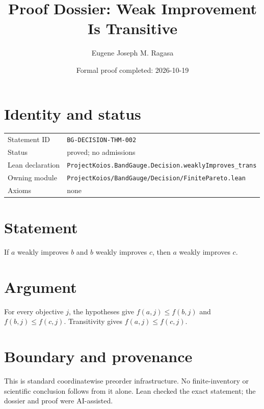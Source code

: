 \documentclass[11pt]{article}
\title{Proof Dossier: Weak Improvement Is Transitive}
\author{Eugene Joseph M. Ragasa}
\date{Formal proof completed: 2026-10-19}
\begin{document}
\maketitle
\section{Identity and status}
\begin{tabularx}{\textwidth}{@{}lX@{}}\toprule
Statement ID & \texttt{BG-DECISION-THM-002} \\
Status & proved; no admissions \\
Lean declaration & \texttt{ProjectKoios.BandGauge.Decision.weaklyImproves\_trans} \\
Owning module & \texttt{ProjectKoios/BandGauge/Decision/FinitePareto.lean} \\
Axioms & none \\
\bottomrule\end{tabularx}
\section{Statement}
If $a$ weakly improves $b$ and $b$ weakly improves $c$, then $a$ weakly improves $c$.
\section{Argument}
For every objective $j$, the hypotheses give $f(a,j)\le f(b,j)$ and
$f(b,j)\le f(c,j)$. Transitivity gives $f(a,j)\le f(c,j)$.
\section{Boundary and provenance}
This is standard coordinatewise preorder infrastructure. No finite-inventory or
scientific conclusion follows from it alone. Lean checked the exact statement; the
dossier and proof were AI-assisted.
\end{document}
